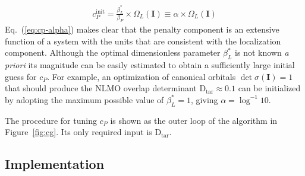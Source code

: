 \documentclass[aps,prl,reprint,amsmath,amssymb]{revtex4-1}
\begin{document}
%
\begin{equation} \label{eq:cp-alpha}
\begin{split}
c_{P}^{\text{init}} = \frac{ \beta_L^{\ast} }{ \beta_P } \times \Omega_L(\mathbf{I}) \equiv \alpha \times \Omega_L(\mathbf{I})
\end{split}
\end{equation}
%
Eq.~(\ref{eq:cp-alpha}) makes clear that the penalty component is an extensive function of a system with the units that are consistent with the localization component. Although the optimal dimensionless parameter $\beta_L^{\ast}$ is not known \emph{a priori} its magnitude can be easily estimated to obtain a sufficiently large initial guess for $c_P$. For example, an optimization of canonical orbitals $\det \sigma(\mathbf{I})=1$ that should produce the NLMO overlap determinant $\text{D}_{\text{tar}} \approx 0.1$ can be initialized by adopting the maximum possible value of $\beta_L^{\ast} = 1$, giving $\alpha = \log^{-1} 10$.

The procedure for tuning $c_P$ is shown as the outer loop of the algorithm in Figure~\ref{fig:cg}. Its only required input is $\text{D}_{\text{tar}}$. 

\subsection{Implementation} 
\end{document}
